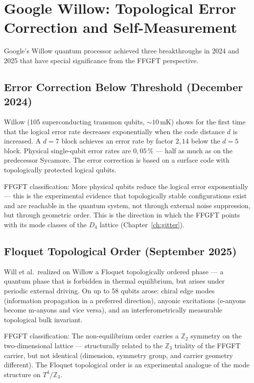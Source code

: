 \section{Google Willow: Topological Error Correction and Self-Measurement}

Google's Willow quantum processor achieved three breakthroughs in 2024 and 2025
that have special significance from the FFGFT perspective.

\subsection*{Error Correction Below Threshold (December 2024)}

Willow (105 superconducting transmon qubits, $\sim10$\,mK) shows for the first time
that the logical error rate decreases exponentially when the code distance
$d$ is increased. A $d = 7$ block achieves an error rate by
factor $2{,}14$ below the $d = 5$ block. Physical single-qubit
error rates are $0{,}05\,\%$ --- half as much as on the
predecessor Sycamore. The error correction is based on a surface code
with topologically protected logical qubits.

FFGFT classification: More physical qubits reduce the logical error
exponentially --- this is the experimental evidence that topologically stable
configurations exist and are reachable in the quantum system, not
through external noise suppression, but through geometric order.
This is the direction in which the FFGFT points with its mode classes of the
$D_4$ lattice (Chapter~\ref{ch:gitter}).

\subsection*{Floquet Topological Order (September 2025)}

Will et al.\ realized on Willow a Floquet topologically ordered
phase --- a quantum phase that is forbidden in thermal equilibrium,
but arises under periodic external driving. On up to
58 qubits arose: chiral edge modes (information propagation in a
preferred direction), anyonic excitations (e-anyons become
m-anyons and vice versa), and an interferometrically measurable
topological bulk invariant.

FFGFT classification: The non-equilibrium order carries a
$\mathbb{Z}_2$ symmetry on the two-dimensional lattice --- structurally
related to the $\mathbb{Z}_3$ triality of the FFGFT carrier, but not
identical (dimension, symmetry group, and carrier geometry different).
The Floquet topological order is an experimental analogue of the
mode structure on $T^4/\mathbb{Z}_3$.

